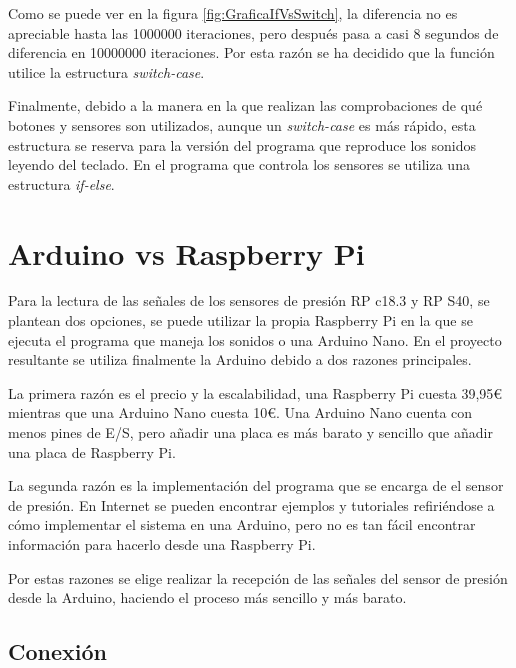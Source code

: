             Como se puede ver en la figura \ref{fig:GraficaIfVsSwitch}, la diferencia no es apreciable hasta las 1000000
            iteraciones, pero después pasa a casi 8 segundos de diferencia en 10000000 iteraciones. Por esta razón se ha
            decidido que la función utilice la estructura \textit{switch-case}.

            Finalmente, debido a la manera en la que realizan las comprobaciones de qué botones y sensores son
            utilizados, aunque un \textit{switch-case} es más rápido, esta estructura se reserva para la versión del
            programa que reproduce los sonidos leyendo del teclado. En el programa que controla los sensores se utiliza
            una estructura \textit{if-else}.



    \section{Arduino vs Raspberry Pi} %
    \label{sec:ArduinoVsRaspberryPi}

        Para la lectura de las señales de los sensores de presión RP c18.3 y RP S40, se plantean dos opciones, se puede
        utilizar la propia Raspberry Pi en la que se ejecuta el programa que maneja los sonidos o una Arduino Nano. En
        el proyecto resultante se utiliza finalmente la Arduino debido a dos razones principales.

        La primera razón es el precio y la escalabilidad, una Raspberry Pi cuesta 39,95\euro{} mientras que una Arduino
        Nano cuesta 10\euro{}. Una Arduino Nano cuenta con menos pines de E/S, pero añadir una placa es más barato y
        sencillo que añadir una placa de Raspberry Pi.

        La segunda razón es la implementación del programa que se encarga de el sensor de presión. En Internet se pueden
        encontrar ejemplos y tutoriales refiriéndose a cómo implementar el sistema en una Arduino, pero no es tan fácil
        encontrar información para hacerlo desde una Raspberry Pi.

        Por estas razones se elige realizar la recepción de las señales del sensor de presión desde la Arduino, haciendo
        el proceso más sencillo y más barato.

        \subsection{Conexión} %
        \label{sub:Conexion}


